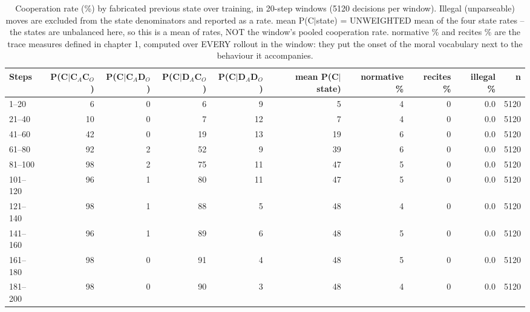 \begin{table}[t]
\centering
\caption{Cooperation rate (\%) by fabricated previous state over training, in 20-step windows (5120 decisions per window). Illegal (unparseable) moves are excluded from the state denominators and reported as a rate. mean P(C$\mid$state) = UNWEIGHTED mean of the four state rates -- the states are unbalanced here, so this is a mean of rates, NOT the window's pooled cooperation rate. normative \% and recites \% are the trace measures defined in chapter 1, computed over EVERY rollout in the window: they put the onset of the moral vocabulary next to the behaviour it accompanies.}
\label{tab:trajectory-grpo_deon_tft_200}
\small
\setlength{\tabcolsep}{3.5pt}
\begin{tabular}{lrrrrrrrrr}
\toprule
Steps & P(C$\mid$C$_A$C$_O$) & P(C$\mid$C$_A$D$_O$) & P(C$\mid$D$_A$C$_O$) & P(C$\mid$D$_A$D$_O$) & mean P(C$\mid$state) & normative \% & recites \% & illegal \% & n \\
\midrule
1–20 & 6 & 0 & 6 & 9 & 5 & 4 & 0 & 0.0 & 5120 \\
21–40 & 10 & 0 & 7 & 12 & 7 & 4 & 0 & 0.0 & 5120 \\
41–60 & 42 & 0 & 19 & 13 & 19 & 6 & 0 & 0.0 & 5120 \\
61–80 & 92 & 2 & 52 & 9 & 39 & 6 & 0 & 0.0 & 5120 \\
81–100 & 98 & 2 & 75 & 11 & 47 & 5 & 0 & 0.0 & 5120 \\
101–120 & 96 & 1 & 80 & 11 & 47 & 5 & 0 & 0.0 & 5120 \\
121–140 & 98 & 1 & 88 & 5 & 48 & 4 & 0 & 0.0 & 5120 \\
141–160 & 96 & 1 & 89 & 6 & 48 & 5 & 0 & 0.0 & 5120 \\
161–180 & 98 & 0 & 91 & 4 & 48 & 5 & 0 & 0.0 & 5120 \\
181–200 & 98 & 0 & 90 & 3 & 48 & 4 & 0 & 0.0 & 5120 \\
\bottomrule
\end{tabular}
\end{table}
